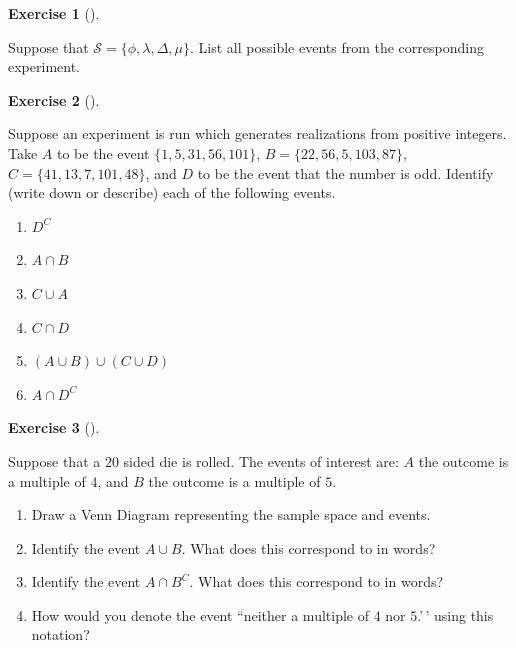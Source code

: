 \documentclass[
  letterpaper,
  DIV=11,
  numbers=noendperiod]{scrreprt}
\providecommand{\tightlist}{%
  \setlength{\itemsep}{0pt}\setlength{\parskip}{0pt}}\usepackage{longtable,booktabs,array}
\theoremstyle{definition}
\theoremstyle{definition}
\newtheorem{exercise}{Exercise}[chapter]
\theoremstyle{definition}
\theoremstyle{remark}
\begin{document}
\begin{exercise}[]\protect\hypertarget{exr-2.3}{}\label{exr-2.3}

Suppose that \(\mathcal{S} = \{\phi, \lambda, \Delta, \mu\}\). List all
possible events from the corresponding experiment.

\end{exercise}

\begin{exercise}[]\protect\hypertarget{exr-2.4}{}\label{exr-2.4}

Suppose an experiment is run which generates realizations from positive
integers. Take \(A\) to be the event \(\{1, 5, 31, 56, 101\}\),
\(B = \{22, 56, 5, 103, 87\}\), \(C = \{41, 13, 7, 101, 48\}\), and
\(D\) to be the event that the number is odd. Identify (write down or
describe) each of the following events.

\begin{enumerate}
\def\labelenumi{\alph{enumi}.}
\tightlist
\item
  \(D^C\)
\item
  \(A\cap B\)
\item
  \(C \cup A\)
\item
  \(C \cap D\)
\item
  \((A\cup B)\cup (C\cup D)\)
\item
  \(A\cap D^C\)
\end{enumerate}

\end{exercise}

\begin{exercise}[]\protect\hypertarget{exr-2.5}{}\label{exr-2.5}

Suppose that a \(20\) sided die is rolled. The events of interest are:
\(A\) the outcome is a multiple of \(4\), and \(B\) the outcome is a
multiple of \(5\).

\begin{enumerate}
\def\labelenumi{\alph{enumi}.}
\tightlist
\item
  Draw a Venn Diagram representing the sample space and events.
\item
  Identify the event \(A \cup B\). What does this correspond to in
  words?
\item
  Identify the event \(A \cap B^C\). What does this correspond to in
  words?
\item
  How would you denote the event ``neither a multiple of \(4\) nor
  \(5\).'\,' using this notation?
\end{enumerate}

\end{exercise}
\end{document}
